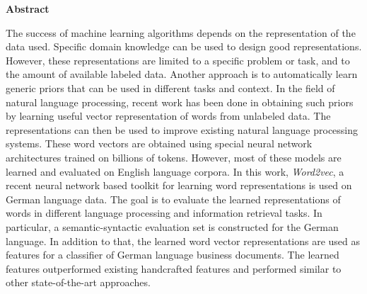 

\clearemptydoublepage
{}
{}	





\vspace*{2cm}
\begin{center}
{\Large \bf Abstract}
\end{center}
\vspace{1cm}

The success of machine learning algorithms  depends on the 
representation of the data used.  Specific domain knowledge can be used to
design good representations. However, these representations are limited to a
specific problem  or task, and to the amount of available labeled data.
Another approach is to automatically learn  generic priors that can be used in different
tasks and context. In the field of natural language processing, recent work
has been done in obtaining such priors by learning useful vector representation of
words from unlabeled data. The representations can then be used to improve
existing natural language processing systems.  These word vectors are  obtained using special neural network architectures   
 trained on billions of tokens. However, most of these models  are learned
and evaluated on English language corpora.       In this work,
\textit{Word2vec}, a recent neural network based  toolkit for learning word
representations is used on German language data. The goal is to evaluate the
learned representations of words in different language processing and information
retrieval tasks. In particular, a semantic-syntactic  evaluation set  is
constructed for the German language. In addition to that, the
learned word vector representations are used as features for a classifier of German
language business documents. The learned features outperformed existing handcrafted features and
performed  similar to other state-of-the-art approaches.





